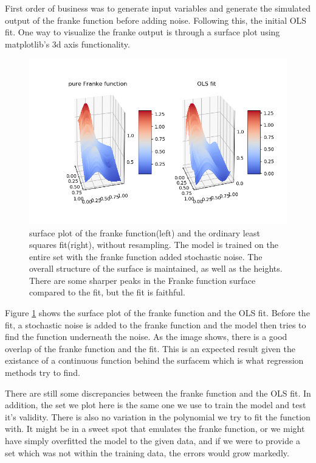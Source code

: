 \documentclass[ 12pt, a4paper ]{article}
\begin{document}
First order of business was to generate input variables and generate the simulated output of
the franke function before adding noise. Following this, the initial OLS fit. One way to 
visualize the franke output is through a surface plot using matplotlib's 3d axis functionality.

\begin{figure}
\includegraphics[scale=0.6]{frankesurface.png}
\caption{
    surface plot of the franke function(left) and the ordinary least squares fit(right), 
    without resampling. The model is trained on the entire set with the franke function 
    added stochastic noise.
    The overall structure of the surface is maintained, as well as the heights. There are 
    some sharper peaks in the Franke function surface compared to the fit, but the fit is
    faithful.
}
\label{fig:frankesurface}
\end{figure}

Figure \ref{fig:frankesurface} shows the surface plot of the franke function and the OLS fit. 
Before the fit, a stochastic noise is added to the franke function and the model then tries to
find the function underneath the noise. As the image shows, there is a good overlap of the 
franke function and the fit. This is an expected result given the existance of a continuous 
function behind the surfacem which is what regression methods try to find. 

There are still some discrepancies between the franke function and the OLS fit. In addition, the 
set we plot here is the same one we use to train the model and test it's validity. There is also 
no variation in the polynomial we try to fit the function with. It might be in a sweet spot that 
emulates the franke function, or we might have simply overfitted the model to the given data, 
and if we were to provide a set which was not within the training data, the errors would grow
markedly.
\end{document}
